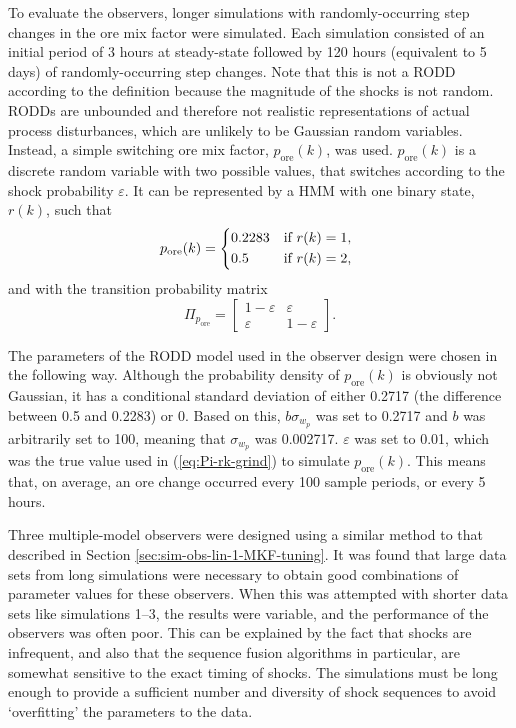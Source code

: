 To evaluate the observers, longer simulations with randomly-occurring step changes in the ore mix factor were simulated. Each simulation consisted of an initial period of 3 hours at steady-state followed by 120 hours (equivalent to 5 days) of randomly-occurring step changes. Note that this is not a \gls{RODD} according to the definition because the magnitude of the shocks is not random. \gls{RODD}s are unbounded and therefore not realistic representations of actual process disturbances, which are unlikely to be Gaussian random variables. Instead, a simple switching ore mix factor, $p_\text{ore}(k)$, was used. $p_\text{ore}(k)$ is a discrete random variable with two possible values, that switches according to the shock probability $\varepsilon$. It can be represented by a \gls{HMM} with one binary state, $r(k)$, such that
%
\begin{equation} \label{eq:pk-grind}
	p_\text{ore}(k) = \begin{cases*}
		0.2283 & if $r(k)=1$, \\
		0.5 & if $r(k)=2$,
	\end{cases*} \\
\end{equation}
and with the transition probability matrix
\begin{equation} \label{eq:Pi-rk-grind}
	\Pi_{p_\text{ore}} = \begin{bmatrix}
		1-\varepsilon & \varepsilon \\
		\varepsilon & 1-\varepsilon
	\end{bmatrix}.
\end{equation}

The parameters of the \gls{RODD} model used in the observer design were chosen in the following way. Although the probability density of $p_\text{ore}(k)$ is obviously not Gaussian, it has a conditional standard deviation of either 0.2717 (the difference between 0.5 and 0.2283) or 0. Based on this, $b\sigma_{w_p}$ was set to 0.2717 and $b$ was arbitrarily set to 100, meaning that $\sigma_{w_p}$ was 0.002717. $\varepsilon$ was set to 0.01, which was the true value used in (\ref{eq:Pi-rk-grind}) to simulate $p_\text{ore}(k)$. This means that, on average, an ore change occurred every 100 sample periods, or every 5 hours.

Three multiple-model observers were designed using a similar method to that described in Section \ref{sec:sim-obs-lin-1-MKF-tuning}. It was found that large data sets from long simulations were necessary to obtain good combinations of parameter values for these observers. When this was attempted with shorter data sets like simulations 1--3, the results were variable, and the performance of the observers was often poor. This can be explained by the fact that shocks are infrequent, and also that the sequence fusion algorithms in particular, are somewhat sensitive to the exact timing of shocks. The simulations must be long enough to provide a sufficient number and diversity of shock sequences to avoid `overfitting' the parameters to the data.

